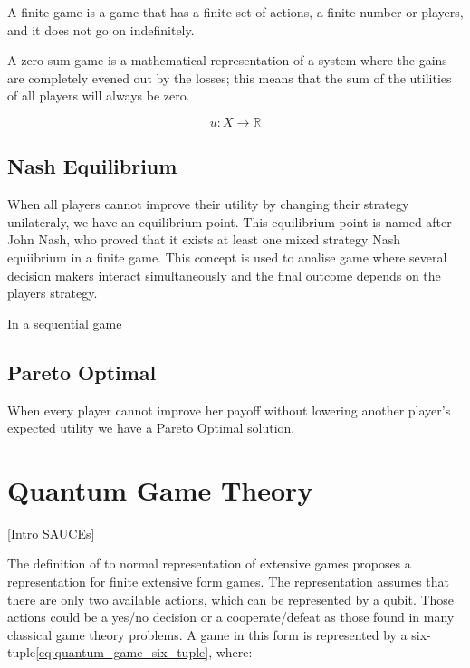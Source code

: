 A finite game is a game that has a finite set of actions, a finite number or players, and it does not go on indefinitely.

A zero-sum game is a mathematical representation of a system where the gains are completely evened out by the losses; this means that the sum of the utilities of all players will always be zero.



\begin{equation}
u:X\rightarrow\mathbb{R}
\label{gt:utilidadesreais}
\end{equation}

\subsection{Nash Equilibrium}
\label{subsec:background:game_theory_nash_equilibrium}

When all players cannot improve their utility by changing their strategy unilateraly, we have an equilibrium point. This equilibrium point is named after John Nash, who proved that it exists at least one mixed strategy Nash equiibrium in a finite game\cite{nash50}\cite{Nash51}. This concept is used to analise game where several decision makers interact simultaneously and the final outcome depends on the players strategy\cite{Osborne2004}.

In a sequential game 

\subsection{Pareto Optimal}
\label{subsec:background:game_theory_pareto_optimal}

When every player cannot improve her payoff without lowering another player's expected utility we have a Pareto Optimal solution.





\section{Quantum Game Theory}
\label{sec:background_quantum_game_theory}
\cite{Eisert2008}
[Intro SAUCEs]

The definition of to normal representation of extensive games proposes a representation
for finite extensive form games\cite{Fra2011}\cite{Fra2011a}. The representation assumes that there
are only two available actions, which can be represented by a qubit.
Those actions could be a yes/no decision or a cooperate/defeat as
those found in many classical game theory problems. A game in this
form is represented by a six-tuple\ref{eq:quantum_game_six_tuple},
where:

